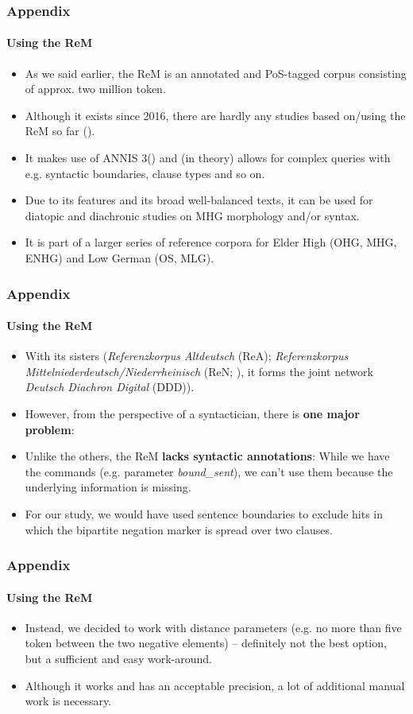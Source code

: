 \documentclass[xcolor=table, compress, %
handout
]{beamer}
\begin{document}
\begin{frame}
\frametitle{Appendix}
\framesubtitle{Using the ReM}
    
\begin{itemize}
    \item As we said earlier, the ReM is an annotated and PoS-tagged corpus consisting of approx. two million token.
    \item Although it exists since 2016, there are hardly any studies based on/using the ReM so far (\citealt{witzenhausen19, Schwarz2019, pickl21}).
    \item It makes use of ANNIS 3(\citealt{Krause2016}) and (in theory) allows for complex queries with e.g. syntactic boundaries, clause types and so on.
    \item Due to its features and its broad well-balanced texts, it can be used for diatopic and diachronic studies on MHG morphology and/or syntax.
    \item It is part of a larger series of reference corpora for Elder High (OHG, MHG, ENHG) and Low German (OS, MLG).
\end{itemize}
    
\end{frame}

\begin{frame}
\frametitle{Appendix}
\framesubtitle{Using the ReM}
    
\begin{itemize}
    \item With its sisters (\textit{Referenzkorpus Altdeutsch} (ReA); \textit{Referenzkorpus Mittelniederdeutsch/Niederrheinisch} (ReN; \citealt{ReNTeam2019}), it forms the joint network \textit{Deutsch Diachron Digital} (DDD)).
    \item However, from the perspective of a syntactician, there is \textbf{one major problem}:
    \item Unlike the others, the ReM \textbf{lacks syntactic annotations}: While we have the commands (e.g. parameter \textit{bound\_sent}), we can't use them because the underlying information is missing.
    \item For our study, we would have used sentence boundaries to exclude hits in which the bipartite negation marker is spread over two clauses.
\end{itemize}
    
\end{frame}

\begin{frame}
\frametitle{Appendix}
\framesubtitle{Using the ReM}
    
    \begin{itemize}
    \item Instead, we decided to work with distance parameters (e.g. no more than five token between the two negative elements) – definitely not the best option, but a sufficient and easy work-around.
    \item Although it works and has an acceptable precision, a lot of additional manual work is necessary.
    \end{itemize}
    
\end{frame}
\end{document}
